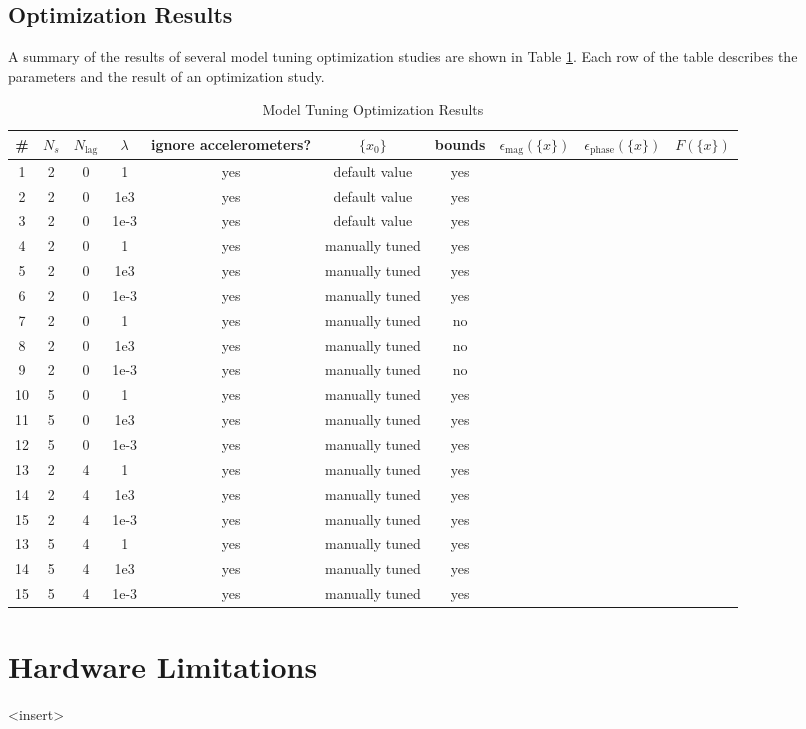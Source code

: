 \subsection{Optimization Results}

A summary of the results of several model tuning optimization studies are shown in Table \ref{tab:optResult}. Each row of the table describes the parameters and the result of an optimization study.

\begin{landscape}
\begin{table}[H]
	\centering
	\label{tab:optResult}
	\caption{Model Tuning Optimization Results}
	\begin{tabular}{cccccccccc}
		\hline\hline
		\# & $N_s$ & $N_\text{lag}$ & $\lambda$ & ignore accelerometers? & $\{x_0\}$ & bounds & $\epsilon_\text{mag}(\{x\})$ & $\epsilon_\text{phase}(\{x\})$ & $F(\{x\})$ \\
		\hline
		1 & 2 & 0 & 1 & yes & default value & yes &  &  &  \\
		2 & 2 & 0 & 1e3 & yes & default value & yes &  &  &  \\
		3 & 2 & 0 & 1e-3 & yes & default value & yes &  &  &  \\
		4 & 2 & 0 & 1 & yes & manually tuned & yes &  &  &  \\
		5 & 2 & 0 & 1e3 & yes & manually tuned & yes &  &  &  \\
		6 & 2 & 0 & 1e-3 & yes & manually tuned & yes &  &  &  \\
		7 & 2 & 0 & 1 & yes & manually tuned & no &  &  &  \\
		8 & 2 & 0 & 1e3 & yes & manually tuned & no &  &  &  \\
		9 & 2 & 0 & 1e-3 & yes & manually tuned & no &  &  &  \\
		10 & 5 & 0 & 1 & yes & manually tuned & yes &  &  &  \\
		11 & 5 & 0 & 1e3 & yes & manually tuned & yes &  &  &  \\
		12 & 5 & 0 & 1e-3 & yes & manually tuned & yes &  &  &  \\
		13 & 2 & 4 & 1 & yes & manually tuned & yes &  &  &  \\
		14 & 2 & 4 & 1e3 & yes & manually tuned & yes &  &  &  \\
		15 & 2 & 4 & 1e-3 & yes & manually tuned & yes &  &  &  \\
		13 & 5 & 4 & 1 & yes & manually tuned & yes &  &  &  \\
		14 & 5 & 4 & 1e3 & yes & manually tuned & yes &  &  &  \\
		15 & 5 & 4 & 1e-3 & yes & manually tuned & yes &  &  &  \\
		\hline\hline
	\end{tabular}
\end{table}
\end{landscape}



\section{Hardware Limitations} %
\label{sec:shortcomings}

<insert>
